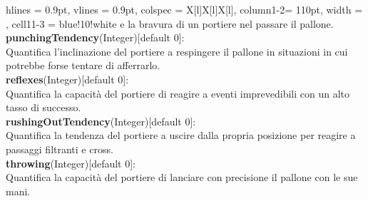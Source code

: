 \begin{tblr}{
    hlines = {0.9pt}, vlines = {0.9pt}, colspec = {X[l]X[l]X[l]}, column{1-2}= {110pt},
    width = \textwidth, cell{1}{1-3} = {blue!10!white}
}
{			e la bravura di un portiere nel passare il pallone.\\
		\medskip\textbf{punchingTendency}(Integer)[default 0]:\\
			Quantifica l'inclinazione del portiere
			a respingere il pallone in situazioni
			in cui potrebbe forse tentare di afferrarlo.\\
		\medskip\textbf{reflexes}(Integer)[default 0]:\\
			Quantifica la capacità del portiere
			di reagire a eventi imprevedibili con
			un alto tasso di successo.\\
		\medskip\textbf{rushingOutTendency}(Integer)[default 0]:\\
			Quantifica la tendenza del portiere a uscire
			dalla propria posizione per reagire
			a passaggi filtranti e cross.\\
		\medskip\textbf{throwing}(Integer)[default 0]:\\
			Quantifica la capacità del portiere di lanciare
			con precisione il pallone con le sue mani.
	}
	\\
\end{tblr}

\newpage



